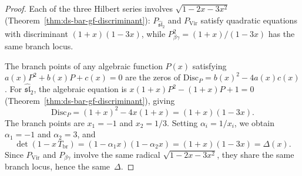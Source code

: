 \begin{proof}
Each of the three Hilbert series involves $\sqrt{1 - 2x - 3x^2}$
(Theorem~\ref{thm:ds-bar-gf-discriminant}):
$P_{\widehat{\mathfrak{sl}}_2}$ and $P_{\mathrm{Vir}}$ satisfy
quadratic equations with discriminant $(1+x)(1-3x)$, while
$P_{\beta\gamma}^2 = (1+x)/(1-3x)$ has the same branch locus.

The branch points of any algebraic function $P(x)$ satisfying
$a(x)P^2 + b(x)P + c(x) = 0$ are the zeros of
$\mathrm{Disc}_P = b(x)^2 - 4a(x)c(x)$. For
$\widehat{\mathfrak{sl}}_2$, the algebraic equation is
$x(1+x)P^2 - (1+x)P + 1 = 0$
(Theorem~\ref{thm:ds-bar-gf-discriminant}), giving
\[
\mathrm{Disc}_P = (1+x)^2 - 4x(1+x) = (1+x)(1-3x).
\]
The branch points are $x_1 = -1$ and $x_2 = 1/3$.
Setting $\alpha_i = 1/x_i$, we obtain $\alpha_1 = -1$ and
$\alpha_2 = 3$, and
\[
\det(1 - x\,T_{\mathrm{br}}) = (1 - \alpha_1 x)(1 - \alpha_2 x)
= (1+x)(1-3x) = \Delta(x).
\]
Since $P_{\mathrm{Vir}}$ and $P_{\beta\gamma}$ involve the same
radical $\sqrt{1-2x-3x^2}$, they share the same branch locus,
hence the same~$\Delta$.
\end{proof}

